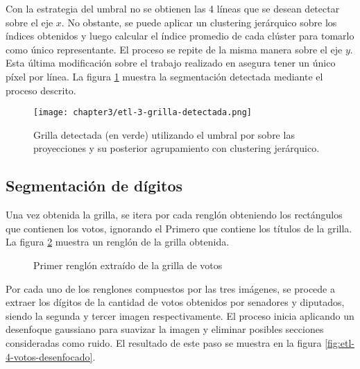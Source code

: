 Con la estrategia del umbral no se obtienen las 4 líneas que se desean detectar sobre el eje $x$. No obstante, se puede
aplicar un clustering jerárquico sobre los índices obtenidos y luego calcular el índice promedio de cada clúster para
tomarlo como único representante. El proceso se repite de la misma manera sobre el eje $y$. Esta última modificación
sobre el trabajo realizado en \parencite{lamagna2016lectura} asegura tener un único píxel por línea. La figura \ref{fig:etl-3-grilla-detectada} muestra
la segmentación detectada mediante el proceso descrito.

\begin{figure}[H]
    \centering
    \texttt{[image: chapter3/etl-3-grilla-detectada.png]}
    \caption[Segmentación de la grilla detectada]{Grilla detectada (en verde) utilizando el umbral por sobre las proyecciones y su posterior agrupamiento con clustering jerárquico.}
    \label{fig:etl-3-grilla-detectada}
\end{figure}

\subsection{Segmentación de dígitos}

Una vez obtenida la grilla, se itera por cada renglón obteniendo los rectángulos que contienen los votos, ignorando el
Primero que contiene los títulos de la grilla. La figura \ref{fig:etl-4-registro} muestra un renglón de la grilla
obtenida.

\begin{figure}[H]
    \centering
    \caption[Primer renglón extraído de la grilla de votos]{Primer renglón extraído de la grilla de votos}
    \label{fig:etl-4-registro}
\end{figure}

Por cada uno de los renglones compuestos por las tres imágenes, se procede a extraer los dígitos de la cantidad de
votos obtenidos por senadores y diputados, siendo la segunda y tercer imagen respectivamente. El proceso inicia
aplicando un desenfoque gaussiano para suavizar la imagen y eliminar posibles secciones consideradas como ruido. El
resultado de este paso se muestra en la figura \ref{fig:etl-4-votos-desenfocado}.

